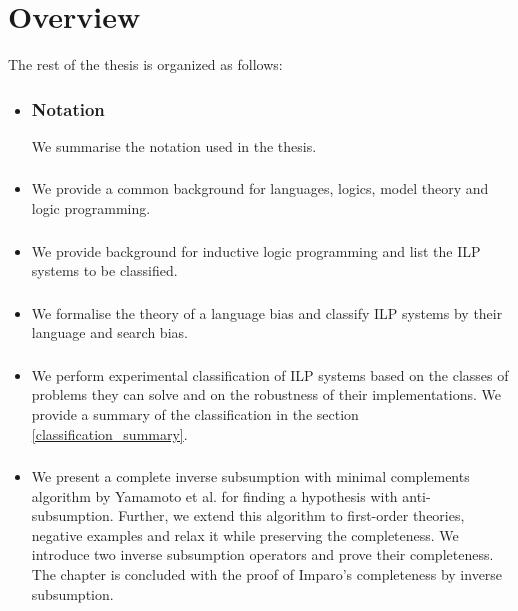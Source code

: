 \section{Overview}
The rest of the thesis is organized as follows:
\begin{itemize}
\item \subsubsection{Notation} We summarise the notation used in the thesis.
\item \subsubsection{} We provide a common background for languages, logics, model theory and logic programming.
\item \subsubsection{}
We provide background for inductive logic programming and list the ILP systems to be classified.
\item \subsubsection{}
We formalise the theory of a language bias and classify ILP systems by their language and search bias.
\item \subsubsection{}
We perform experimental classification of ILP systems based on the classes of problems they can solve and on the robustness of their implementations.
We provide a summary of the classification in the section \ref{classification_summary}.
\item \subsubsection{}
We present a complete inverse subsumption with minimal complements algorithm by Yamamoto et al. \cite{yamamoto2012inverse} for finding a hypothesis with anti-subsumption. Further, we extend this algorithm to first-order theories, negative examples and relax it while preserving the completeness. We introduce two inverse subsumption operators and prove their completeness. The chapter is concluded with the proof of Imparo's completeness by inverse subsumption.

\end{itemize}
